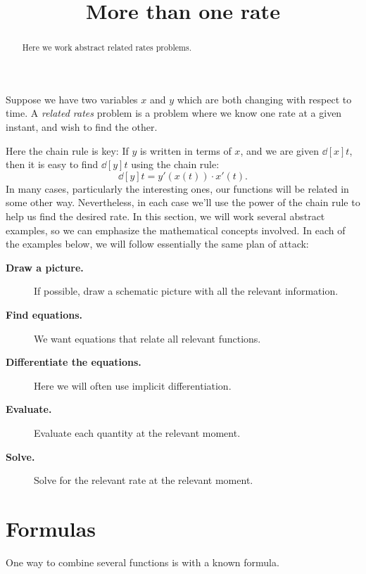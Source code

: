 \documentclass{ximera}
\title[Dig-In:]{More than one rate}
\begin{document}
\begin{abstract}
  Here we work abstract related rates problems.
\end{abstract}
\maketitle


Suppose we have two variables $x$ and $y$ which are both changing with
respect to time.  A \textit{related rates} problem is a problem where
we know one rate at a given instant, and wish to find the other.

Here the chain rule is key: If $y$ is written in terms of $x$, and we
are given $\dd[x]{t}$, then it is easy to find $\dd[y]{t}$ using the
chain rule:
\[
\dd[y]{t}=y'(x(t))\cdot x'(t).
\]
In many cases, particularly the interesting ones, our functions will
be related in some other way. Nevertheless, in each case we'll use the
power of the chain rule to help us find the desired rate. In this
section, we will work several abstract examples, so we can emphasize
the mathematical concepts involved. In each of the examples below, we
will follow essentially the same plan of attack:

\begin{description}
\item[\textbf{Draw a picture.}] If possible, draw a schematic picture
  with all the relevant information.
\item[\textbf{Find equations.}] We want equations that relate all
  relevant functions.
\item[\textbf{Differentiate the equations.}] Here we will often use
  implicit differentiation.
\item[\textbf{Evaluate.}] Evaluate
  each quantity  at the  relevant moment. 
    \item[\textbf{Solve.}] Solve for the relevant
  rate at the relevant moment.

\end{description}


\section{Formulas}

One way to combine several functions is with a known formula.
\end{document}
